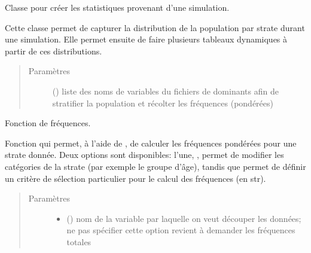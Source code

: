 \documentclass[letterpaper,10pt,french]{sphinxmanual}
\begin{document}
\begin{fulllineitems}
\label{\detokenize{utilisation:simgen.statistics}}
Classe pour créer les statistiques provenant d’une simulation.

Cette classe permet de capturer la distribution de la population par strate durant une simulation. Elle permet ensuite de faire plusieurs tableaux dynamiques à partir de ces distributions.
\begin{quote}\begin{description}
\item[{Paramètres}] \leavevmode
{} () \textendash{} liste des noms de variables du fichiers de dominants afin de stratifier la population et récolter les fréquences (pondérées)

\end{description}\end{quote}

\begin{fulllineitems}
\label{\detokenize{utilisation:simgen.statistics.freq}}
Fonction de fréquences.

Fonction qui permet, à l’aide de , de calculer les fréquences pondérées pour une strate donnée. Deux options sont disponibles: l’une, , permet de modifier les catégories de la strate (par exemple le groupe d’âge), tandis que  permet de définir un critère de sélection particulier pour le calcul des fréquences (en str).
\begin{quote}\begin{description}
\item[{Paramètres}] \leavevmode\begin{itemize}
\item {} 
 () \textendash{} nom de la variable par laquelle on veut découper les données; ne pas spécifier cette option revient à demander les fréquences totales


\end{itemize}
\end{description}
\end{quote}
\end{fulllineitems}
\end{fulllineitems}
\end{document}
